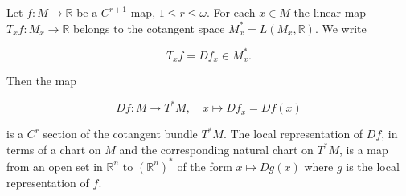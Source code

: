 Let $f: M \rightarrow \mathbb{R}$ be a $C^{r+1}$ map, $1 \leqslant r \leqslant \omega$. For each $x \in M$ the linear map $T_x f: M_x \rightarrow \mathbb{R}$ belongs to the cotangent space $M_x^* = L(M_x, \mathbb{R})$. We write

$$T_x f = Df_x \in M_x^*.$$

Then the map

$$Df: M \rightarrow T^*M, \quad x \mapsto Df_x = Df(x)$$

is a $C^r$ section of the cotangent bundle $T^*M$. The local representation of $Df$, in terms of a chart on $M$ and the corresponding natural chart on $T^*M$, is a map from an open set in $\mathbb{R}^n$ to $(\mathbb{R}^n)^*$ of the form $x \mapsto Dg(x)$ where $g$ is the local representation of $f$.
